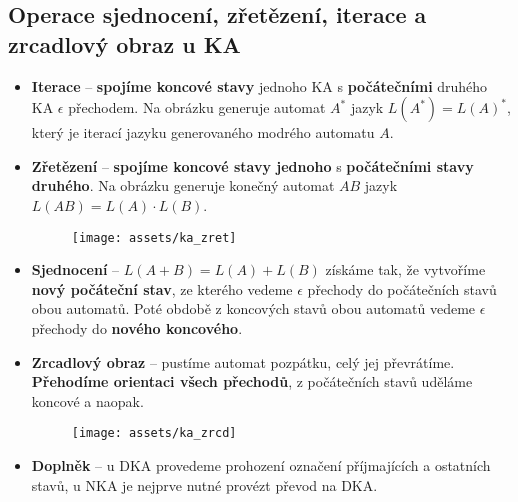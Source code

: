 \subsection{Operace sjednocení, zřetězení, iterace a zrcadlový obraz u KA}
\begin{itemize}
    \item \textbf{Iterace} -- \textbf{spojíme koncové stavy} jednoho KA s \textbf{počátečními} druhého KA $\epsilon$ přechodem. Na obrázku generuje automat $A^*$ jazyk $L(A^*) = L(A)^*$, který je iterací jazyku generovaného modrého automatu $A$.
    \item \textbf{Zřetězení} -- \textbf{spojíme koncové stavy jednoho} s \textbf{počátečními stavy druhého}. Na obrázku generuje konečný automat $AB$ jazyk $L(AB) = L(A) \cdot L(B)$.
          \begin{figure}[H]
              \centering
              \texttt{[image: assets/ka\_zret]}
          \end{figure}
    \item \textbf{Sjednocení} -- $L(A + B) = L(A) + L(B)$ získáme tak, že vytvoříme \textbf{nový počáteční stav}, ze kterého vedeme $\epsilon$ přechody do počátečních stavů obou automatů. Poté obdobě z koncových stavů obou automatů vedeme $\epsilon$ přechody do \textbf{nového koncového}.
    \item \textbf{Zrcadlový obraz} -- pustíme automat pozpátku, celý jej převrátíme. \textbf{Přehodíme orientaci všech přechodů}, z počátečních stavů uděláme koncové a naopak.
          \begin{figure}[H]
              \centering
              \texttt{[image: assets/ka\_zrcd]}
          \end{figure}
    \item \textbf{Doplněk} -- u DKA provedeme prohození označení příjmajících a ostatních stavů, u NKA je nejprve nutné provézt převod na DKA.
\end{itemize}
